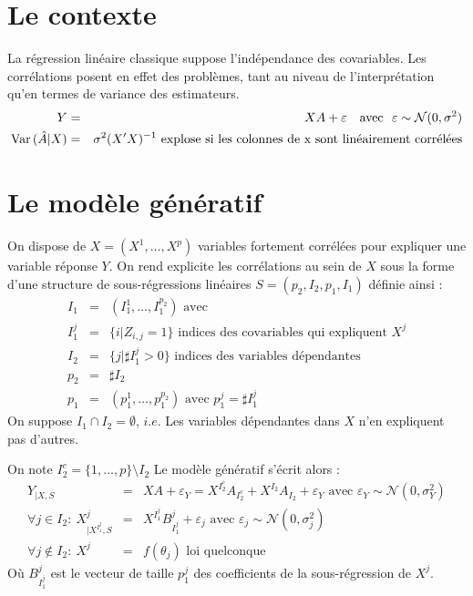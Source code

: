 \documentclass[12pt]{article}
\begin{document}

\section{Le contexte}
	La régression linéaire classique suppose l'indépendance des covariables. Les corrélations posent en effet des problèmes, tant au niveau de l'interprétation qu'en termes de variance des estimateurs.
	\begin{eqnarray}
		Y&=&XA+\varepsilon \ \ \textrm{ avec } \ \varepsilon\sim \mathcal{N}(0,\sigma^2) \\
		{\rm Var}\,(\hat{A}|X)&=& \sigma^2(X'X)^{-1} \textrm{ explose si les colonnes de x sont linéairement corrélées}
	\end{eqnarray}
			
	
	
\section{Le modèle génératif}
On dispose de $X=(X^1,\dots,X^p)$ variables fortement corrélées pour expliquer une variable réponse $Y$.
On rend explicite les corrélations au sein de $X$ sous la forme d'une structure de sous-régressions linéaires $S=(p_2,I_2,p_1,I_1)$ définie ainsi :
	\begin{eqnarray}
		I_1&=&(I_1^1,\dots,I_1^{p_2}) \textrm{ avec}		\\
		I_1^j &=& \{i |Z_{i,j}=1 \} \textrm{ indices des covariables qui expliquent $X^j$} \\
		I_2&=&\{j |\sharp I_1^j>0 \}  \textrm{ indices des variables dépendantes} \\
		p_2&=& \sharp I_2 \\
		p_1&=&(p_1^1,\dots,p_1^{p_2}) \textrm{ avec }p_1^j=\sharp I_1^j 
	\end{eqnarray}
	On suppose $I_1\cap I_2=\emptyset$, $i.e.$ Les variables dépendantes dans $X$ n'en expliquent pas d'autres. 
	
	On note $I_2^c=\{1,\dots,p\}\setminus I_2$
Le modèle génératif s'écrit alors :
\begin{eqnarray}
	Y_{|X,S}&=&XA+\varepsilon_Y= X^{I_2^c}A_{I_2^c}+X^{I_2}A_{I_2}+\varepsilon_Y \textrm{ avec } \varepsilon_Y \sim \mathcal{N}(0,\sigma_Y^2) \label{MainR}\\
	\forall j \in I_2 : \  X^j_{|X^{I_1^j},S}&=&X^{I_1^j}B_{I_1^j}^j + \varepsilon_{j} \textrm{ avec } \varepsilon_j \sim \mathcal{N}(0,\sigma_j^2) \label{SR}\\
    \forall j \notin I_2 : \ X^j &=& f(\theta_j) \textrm{ loi quelconque}	
\end{eqnarray}
Où $B_{I_1^j}^j$ est le vecteur de taille $p_1^j$ des coefficients de la sous-régression de $X^j$.
\end{document}
